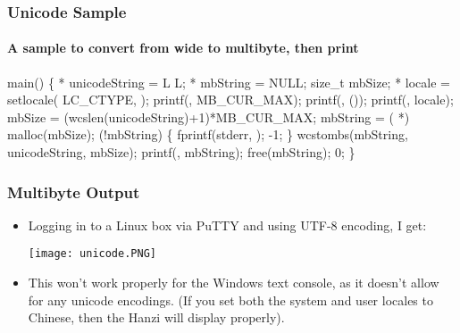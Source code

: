 \documentclass[smaller,table]{beamer} %
\begin{document}
\begin{frame}[fragile]
\frametitle{Unicode Sample}
\framesubtitle{A sample to convert from wide to multibyte, then print}
\vspace{-0.1in}
\begin{semiverbatim}
\tiny
\kr\kl{} 
\kl{} 
\kl{} 
\kl{} 
\kl
\kl{} main()
\kl\{
\kl   {} * unicodeString = L
\kl                             L;
\kl   {} * mbString = NULL;
\kl   size\_t mbSize;
\kl   {}
\kl   {} * locale = setlocale( LC\_CTYPE, );
\kl   printf(, MB\_CUR\_MAX);
\kl   printf(, ());
\kl   printf(, locale);
\kl
\kl   mbSize = (wcslen(unicodeString)+1)*MB\_CUR\_MAX;
\kl   mbString = ( *) malloc(mbSize);
\kl   {} (!mbString)
\kl   \{
\kl      fprintf(stderr, );
\kl      {} -1;
\kl   \}
\kl
\kl   wcstombs(mbString, unicodeString, mbSize);
\kl   printf(, mbString);
\kl   free(mbString); 
\kl   {} 0;
\kl\}
\end{semiverbatim}
\end{frame}

\begin{frame}
\frametitle{Multibyte Output}
\begin{itemize}
\item Logging in to a Linux box via PuTTY and using UTF-8 encoding, I get:
\begin{center}
\texttt{[image: unicode.PNG]}
\end{center}
\item This won't work properly for the Windows text console, as it doesn't allow for any unicode encodings. (If you set both the system and user locales to Chinese, then the Hanzi will display properly).
\end{itemize}
\end{frame}
\end{document}
